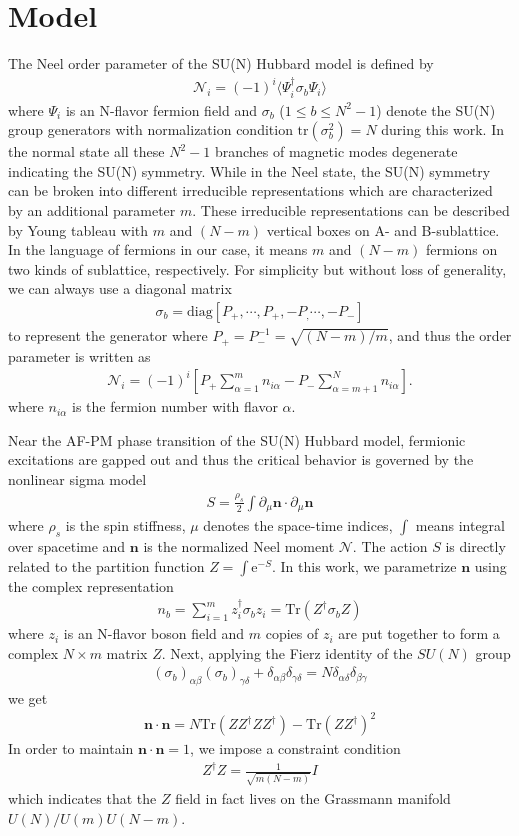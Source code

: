 \documentclass[aps,twocolumn,superscriptaddress]{revtex4-1}
\newcommand{\bea}{\begin{eqnarray}}
\newcommand{\eea}{\end{eqnarray}}
\newcommand{\bn}{\mathbf{n}}
\newcommand{\me}{\mathrm{e}}
\begin{document}
\section{Model}
The Neel order parameter of the SU(N) Hubbard model is defined by \bea \mathcal{N}_i=(-1)^i\langle \Psi_i^\dagger \sigma_b \Psi_i\rangle \eea where $\Psi_i$ is an N-flavor fermion field and $\sigma_b$ ($1\le b\le N^2-1$) denote the SU(N) group generators with normalization condition $\mathrm{tr}(\sigma_b^2)=N$ during this work. In the normal state all these $N^2-1$ branches of magnetic modes degenerate indicating the SU(N) symmetry. While in the Neel state, the SU(N) symmetry can be broken into different irreducible representations which are characterized by an additional parameter $m$. These irreducible representations can be described by Young tableau with $m$ and $(N-m)$ vertical boxes on A- and B-sublattice. In the language of fermions in our case, it means $m$ and $(N-m)$ fermions on two kinds of sublattice, respectively. For simplicity but without loss of generality, we can always use a diagonal matrix \bea \sigma_b=\text{diag}\left[P_+,\cdots,P_+,-P_,\cdots,-P_-\right] \eea to represent the generator where $P_+=P_-^{-1}=\sqrt{(N-m)/m}$, and thus the order parameter is written as \bea \mathcal{N}_i=(-1)^i\left[P_+\sum_{\alpha=1}^m n_{i\alpha}-P_-\sum_{\alpha=m+1}^{N}n_{i\alpha} \right]. \eea where $n_{i\alpha}$ is the fermion number with flavor $\alpha$. 

Near the AF-PM phase transition of the SU(N) Hubbard model, fermionic excitations are gapped out and thus the critical behavior is governed by the nonlinear sigma model
\bea \label{eq:NLsM}S=\frac{\rho_s}{2}\int \partial_\mu\bn \cdot \partial_\mu\bn \eea
where $\rho_s$ is the spin stiffness, $\mu$ denotes the space-time indices, $\int$ means integral over spacetime and $\bn$ is the normalized Neel moment $\mathcal{N}$. The action $S$ is directly related to the partition function $Z=\int \me^{-S}$. In this work, we parametrize $\bn$ using the complex representation \bea \label{eq:cprep}n_b=\sum_{i=1}^m z_i^\dag \sigma_b z_i=\mathrm{Tr}(Z^\dag\sigma_b Z) \eea where $z_i$ is an N-flavor boson field and $m$ copies of $z_i$ are put together to form a complex $N\times m$ matrix $Z$. Next, applying the Fierz identity of the $SU(N)$ group
\bea \label{eq:Fierz} (\sigma_b)_{\alpha\beta} (\sigma_b)_{\gamma\delta}+\delta_{\alpha\beta}\delta_{\gamma\delta}=N\delta_{\alpha\delta}\delta_{\beta\gamma} \eea
we get
\bea \bn\cdot\bn = N\mathrm{Tr}(ZZ^\dag Z Z^\dag)-\mathrm{Tr}(ZZ^\dag)^2 \eea
In order to maintain $\bn\cdot\bn=1$, we impose a constraint condition \bea Z^\dag Z=\frac{1}{\sqrt{m(N-m)}}I \label{eq:normalizeZ}\eea
which indicates that the $Z$ field in fact lives on the Grassmann manifold $U(N)/U(m)U(N-m)$. 
\end{document}

